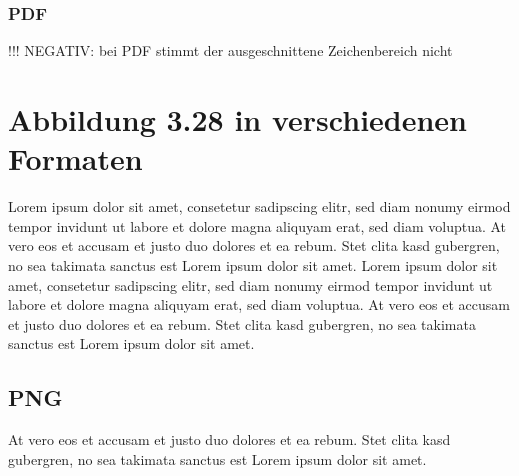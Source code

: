 \documentclass[11pt]{scrartcl}
\begin{document}
\subsubsection{PDF}
!!! NEGATIV: bei PDF stimmt der ausgeschnittene Zeichenbereich nicht	
\begin{figure}[htbp]
   \centering
   \setlength{\fboxsep}{5pt}
   \setlength{\fboxrule}{2pt}
\end{figure}

\newpage

\section{Abbildung 3.28 in verschiedenen Formaten}

Lorem ipsum dolor sit amet, consetetur sadipscing elitr, sed diam nonumy eirmod tempor invidunt ut labore et dolore magna aliquyam erat, sed diam voluptua. At vero eos et accusam et justo duo dolores et ea rebum. Stet clita kasd gubergren, no sea takimata sanctus est Lorem ipsum dolor sit amet. Lorem ipsum dolor sit amet, consetetur sadipscing elitr, sed diam nonumy eirmod tempor invidunt ut labore et dolore magna aliquyam erat, sed diam voluptua. At vero eos et accusam et justo duo dolores et ea rebum. Stet clita kasd gubergren, no sea takimata sanctus est Lorem ipsum dolor sit amet.

\subsection{PNG}
At vero eos et accusam et justo duo dolores et ea rebum. Stet clita kasd gubergren, no sea takimata sanctus est Lorem ipsum dolor sit amet.
\end{document}
